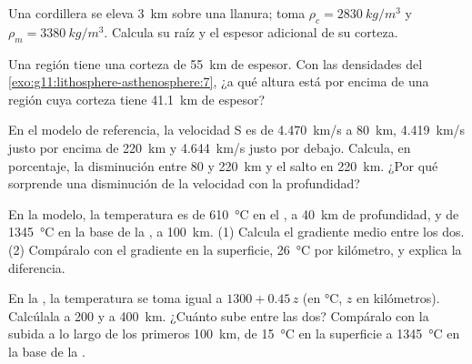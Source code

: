\begin{exercise}[$\star\star$]\label{exo:g11:lithosphere-asthenosphere:7}
Una cordillera se eleva \qty{3}{km} sobre una llanura; toma $\rho_c =
\qty{2830}{kg/m^3}$ y $\rho_m = \qty{3380}{kg/m^3}$. Calcula su raíz y el
espesor adicional de su corteza.
\end{exercise}

\begin{exercise}[$\star\star$]\label{exo:g11:lithosphere-asthenosphere:8}
Una región tiene una corteza de \qty{55}{km} de espesor. Con las densidades
del \cref{exo:g11:lithosphere-asthenosphere:7}, ¿a qué altura está por
encima de una región cuya corteza tiene \qty{41.1}{km} de espesor?
\end{exercise}

\begin{exercise}[$\star\star$]\label{exo:g11:lithosphere-asthenosphere:9}
En el modelo de referencia, la velocidad S es de \qty{4.470}{km/s} a
\qty{80}{km}, \qty{4.419}{km/s} justo por encima de \qty{220}{km} y
\qty{4.644}{km/s} justo por debajo. Calcula, en porcentaje, la disminución
entre 80 y \qty{220}{km} y el salto en \qty{220}{km}. ¿Por qué sorprende una
disminución de la velocidad con la profundidad?
\end{exercise}

\begin{exercise}[$\star\star$]\label{exo:g11:lithosphere-asthenosphere:10}
En la  modelo, la temperatura es de \qty{610}{\celsius} en el , a
\qty{40}{km} de profundidad, y de \qty{1345}{\celsius} en la base de la
, a \qty{100}{km}. (1) Calcula el gradiente medio entre los dos. (2)
Compáralo con el gradiente en la superficie, \qty{26}{\celsius} por
kilómetro, y explica la diferencia.
\end{exercise}

\begin{exercise}[$\star\star$]\label{exo:g11:lithosphere-asthenosphere:11}
En la , la temperatura se toma igual a $1300 + 0.45\,z$ (en
\unit{\celsius}, $z$ en kilómetros). Calcúlala a 200 y a \qty{400}{km}.
¿Cuánto sube entre las dos? Compáralo con la subida a lo largo de los primeros
\qty{100}{km}, de \qty{15}{\celsius} en la superficie a \qty{1345}{\celsius}
en la base de la .
\end{exercise}

